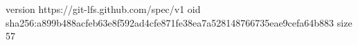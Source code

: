 version https://git-lfs.github.com/spec/v1
oid sha256:a899b488acfeb63e8f592ad4cfe871fe38ea7a528148766735eae9cefa64b883
size 57
